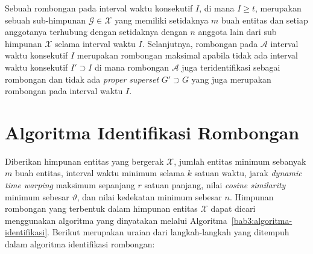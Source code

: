 Sebuah rombongan pada interval waktu konsekutif $I$, di mana $I \geq t$, merupakan sebuah sub-himpunan $\mathcal{G} \in \mathcal{X}$ yang memiliki setidaknya $m$ buah entitas dan setiap anggotanya terhubung dengan setidaknya dengan $n$ anggota lain dari sub himpunan $\mathcal{X}$ selama interval waktu $I$. Selanjutnya, rombongan pada $\mathcal{A}$ interval waktu konsekutif $I$ merupakan rombongan maksimal apabila tidak ada interval waktu konsekutif $I' \supset I$ di mana rombongan $\mathcal{A}$ juga teridentifikasi sebagai rombongan dan tidak ada \textit{proper superset} $G' \supset G$ yang juga merupakan rombongan pada interval waktu $I$.

\section{Algoritma Identifikasi Rombongan}
\label{sec:algoritma}
    
Diberikan himpunan entitas yang bergerak $\mathcal{X}$, jumlah entitas minimum sebanyak $m$ buah entitas, interval waktu minimum selama $k$ satuan waktu, jarak \textit{dynamic time warping} maksimum sepanjang $r$ satuan panjang, nilai \textit{cosine similarity} minimum sebesar $\vartheta$, dan nilai kedekatan minimum sebesar $n$. Himpunan rombongan yang terbentuk dalam himpunan entitas $\mathcal{X}$ dapat dicari menggunakan algoritma yang dinyatakan melalui Algoritma~\ref{bab3:algoritma-identifikasi}. Berikut merupakan uraian dari langkah-langkah yang ditempuh dalam algoritma identifikasi rombongan:


